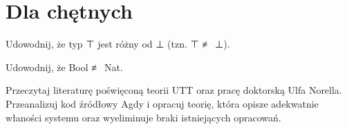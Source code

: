\section{Dla chętnych}

\begin{zadanie}

Udowodnij, że typ ⊤ jest różny od ⊥ (tzn. ⊤ ≢ ⊥).

\end{zadanie}

\begin{zadanie}

Udowodnij, że Bool ≢ Nat.

\end{zadanie}


\begin{zadanie}
Przeczytaj literaturę poświęconą teorii UTT oraz pracę doktorską Ulfa Norella.
Przeanalizuj kod źródłowy Agdy i opracuj teorię, która opisze adekwatnie właności
systemu oraz wyeliminuje braki istniejących opracowań.
\end{zadanie}
